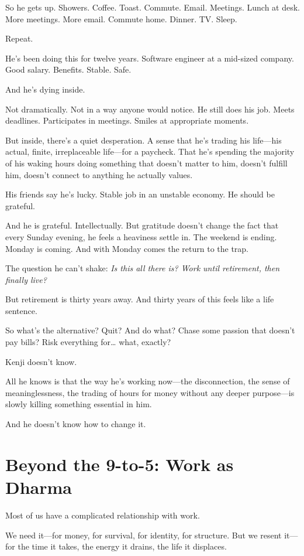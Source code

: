 \documentclass[11pt,twoside]{book}
\begin{document}
So he gets up. Showers. Coffee. Toast. Commute. Email. Meetings. Lunch at desk. More meetings. More email. Commute home. Dinner. TV. Sleep.

Repeat.

He's been doing this for twelve years. Software engineer at a mid-sized company. Good salary. Benefits. Stable. Safe.

And he's dying inside.

Not dramatically. Not in a way anyone would notice. He still does his job. Meets deadlines. Participates in meetings. Smiles at appropriate moments.

But inside, there's a quiet desperation. A sense that he's trading his life—his actual, finite, irreplaceable life—for a paycheck. That he's spending the majority of his waking hours doing something that doesn't matter to him, doesn't fulfill him, doesn't connect to anything he actually values.

His friends say he's lucky. Stable job in an unstable economy. He should be grateful.

And he is grateful. Intellectually. But gratitude doesn't change the fact that every Sunday evening, he feels a heaviness settle in. The weekend is ending. Monday is coming. And with Monday comes the return to the trap.

The question he can't shake: \emph{Is this all there is? Work until retirement, then finally live?}

But retirement is thirty years away. And thirty years of this feels like a life sentence.

So what's the alternative? Quit? And do what? Chase some passion that doesn't pay bills? Risk everything for\ldots{} what, exactly?

Kenji doesn't know.

All he knows is that the way he's working now—the disconnection, the sense of meaninglessness, the trading of hours for money without any deeper purpose—is slowly killing something essential in him.

And he doesn't know how to change it.

\section*{Beyond the 9-to-5: Work as Dharma}

Most of us have a complicated relationship with work.

We need it—for money, for survival, for identity, for structure. But we resent it—for the time it takes, the energy it drains, the life it displaces.
\end{document}
